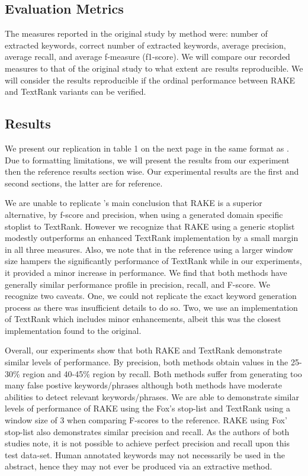 \documentclass[11pt,a4paper]{article}
\begin{document}
\subsection{Evaluation Metrics}

The measures reported in the original study by method were: number of extracted keywords, correct number of extracted keywords, average precision, average recall, and average f-measure (f1-score).  We will compare our recorded measures to that of the original study to what extent are  results reproducible. We will consider the results reproducible if the ordinal performance between RAKE and TextRank variants can be verified. 

\subsection{Results}

We present our replication in table 1 on the next page in the same format as \citet{1}. Due to formatting limitations, we will present the results from our experiment then the reference results section wise. Our experimental results are the first and second sections, the latter are for reference.

We are unable to replicate \citet{1}'s main conclusion that RAKE is a superior alternative, by f-score and precision, when using a generated domain specific stoplist to TextRank. However we recognize that RAKE using a generic stoplist modestly outperforms an enhanced TextRank implementation by a small margin in all three measures. Also, we note that in the reference using a larger window size hampers the significantly performance of TextRank while in our experiments, it provided a minor increase in performance. We find that both methods have generally similar performance profile in precision, recall, and F-score. We recognize two caveats. One, we could not replicate the exact keyword generation process as there was insufficient details to do so. Two, we use an implementation of TextRank which includes minor enhancements, albeit this was the closest implementation found to the original. 

Overall, our experiments show that both RAKE and TextRank demonstrate similar levels of performance. By precision, both methods obtain values in the 25-30\% region and 40-45\% region by recall. Both methods suffer from generating too many false postive keywords/phrases although both methods have moderate abilities to detect relevant keywords/phrases. We are able to demonstrate similar levels of performance of RAKE using the Fox's stop-list and TextRank using a window size of 3 when comparing F-scores to the reference. RAKE using Fox' stop-list also demonstrates similar precision and recall. As the authors of both studies note, it is not possible to achieve perfect precision and recall upon this test data-set. Human annotated keywords may not necessarily be used in the abstract, hence they may not ever be produced via an extractive method.
\end{document}

